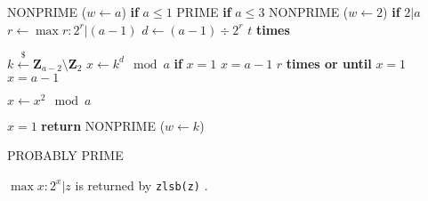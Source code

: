\vspace{1em}
\hspace{-2.8ex}
\begin{minipage}{\linewidth}
\begin{algorithmic}
    \RETURN NONPRIME ($w \gets a$) {\bf if} {$a \le 1$}
    \RETURN PRIME {\bf if} {$a \le 3$}
    \RETURN NONPRIME ($w \gets 2$) {\bf if} {$2 \vert a$}
    \STATE $r \gets \max r : 2^r \vert (a - 1)$
    \STATE $d \gets (a - 1) \div 2^r$
     $t$ {\bf times}
    
    \hspace{2ex}
    \begin{minipage}{\linewidth}
        \STATE $k \xleftarrow{\$} \textbf{Z}_{a - 2} \setminus \textbf{Z}_{2}$
        \STATE $x \gets k^d \mod a$
         {\bf if} $x = 1$ \OR $x = a - 1$
         $r$ {\bf times or until} $x = 1$ \OR $x = a - 1$

        \hspace{2ex}
        \begin{minipage}{\linewidth}
            \vspace{-1ex}
            \STATE $x \gets x^2 \mod a$
        \end{minipage}
        \vspace{-1.5em}
         $x = 1$ {\bf return} NONPRIME ($w \gets k$)
    \end{minipage}
    \vspace{-0.8ex}
    \RETURN PROBABLY PRIME
\end{algorithmic}
\end{minipage}
\vspace{1em}

\noindent
$\max x : 2^x \vert z$ is returned by {\tt zlsb(z)}
.
